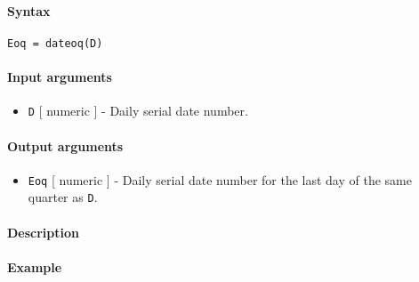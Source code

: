 


	\paragraph{Syntax}\label{syntax}

\begin{verbatim}
Eoq = dateoq(D)
\end{verbatim}

\paragraph{Input arguments}\label{input-arguments}

\begin{itemize}
\itemsep1pt\parskip0pt
\item
  \texttt{D} {[} numeric {]} - Daily serial date number.
\end{itemize}

\paragraph{Output arguments}\label{output-arguments}

\begin{itemize}
\itemsep1pt\parskip0pt
\item
  \texttt{Eoq} {[} numeric {]} - Daily serial date number for the last
  day of the same quarter as \texttt{D}.
\end{itemize}

\paragraph{Description}\label{description}

\paragraph{Example}\label{example}


